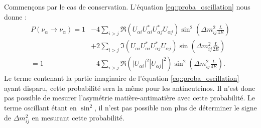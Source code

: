            Commençons par le cas de conservation. L'équation \eqref{eq::proba_oscillation} nous donne :
            \begin{equation}\label{eq::proba_non_oscillation}
                \begin{split}
                    P(\nu_{\alpha}\to\nu_{\alpha}) = 1 & - 4\sum_{i>j}\Re(U_{\alpha i}U_{\alpha i}^*U_{\alpha j}^*U_{\alpha j})\sin^2\left(\Delta m_{ij}^2\frac{L}{4E}\right) \\
                    & + 2\sum_{i>j}\Im(U_{\alpha i}U_{\alpha i}^*U_{\alpha j}^*U_{\alpha j})\sin\left(\Delta m_{ij}^2\frac{L}{2E}\right) \\
                    = 1 & -4\sum_{i>j}\Re(|U_{\alpha i}|^2|U_{\alpha j}|^2)\sin^2\left(\Delta m_{ij}^2\frac{L}{4E}\right).
                \end{split}
            \end{equation}
            Le terme contenant la partie imaginaire de l'équation \eqref{eq::proba_oscillation} ayant disparu, cette probabilité sera la même pour les antineutrinos. Il n'est donc pas possible de mesurer l'asymétrie matière-antimatière avec cette probabilité. Le terme oscillant étant en $\sin^2$, il n'est pas possible non plus de déterminer le signe de $\Delta m_{ij}^2$ en mesurant cette probabilité.
            
